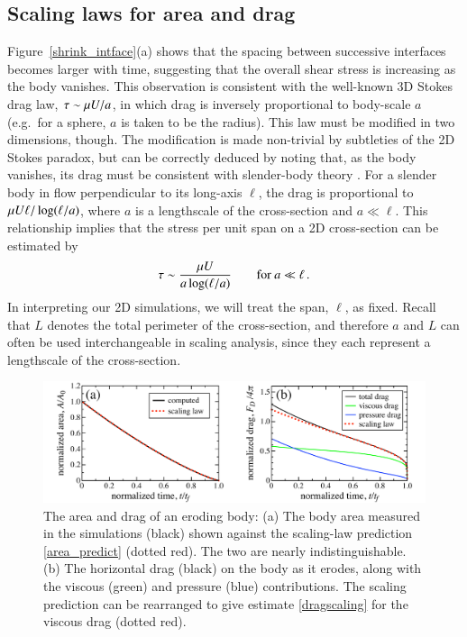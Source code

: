 \documentclass[preprint, 10pt]{elsarticle}
\begin{document}
\subsection{Scaling laws for area and drag}
\label{sec:scaling}

Figure~\ref{shrink_intface}(a) shows that the spacing between successive interfaces becomes larger with time, suggesting that the overall shear stress is increasing as the body vanishes. This observation is consistent with the well-known 3D Stokes drag law, $\tau \sim \mu U / a$, in which drag is inversely proportional to body-scale $a$ (e.g.~for a sphere, $a$ is taken to be the radius). This law must be modified in two dimensions, though. The modification is made non-trivial by subtleties of the 2D Stokes paradox, but can be correctly deduced by noting that, as the body vanishes, its drag must be consistent with slender-body theory \cite{poz1997, bouzarth2007epicyclic, camassa2008trajectory, MooreJFM2012, zhao2015transportation}. 
For a slender body in flow perpendicular to its long-axis $\ell$, the drag is proportional to
$\mu U \ell/ \log(\ell/a)$, where $a$ is a lengthscale of the cross-section and $a \ll \ell$. This relationship implies that the stress per unit span on a 2D cross-section can be estimated by
\begin{align}
  \label{eqn:stresslaw}
  \tau \sim \frac{\mu U}{a \log(\ell/a)} \qquad \text{for } a \ll \ell \, .
\end{align}
In interpreting our 2D simulations, we will treat the span, $\ell$, as fixed. Recall that $L$ denotes the total perimeter of the cross-section, and therefore $a$ and $L$ can often be used interchangeable in scaling analysis, since they each represent a lengthscale of the cross-section.

\begin{figure}%
\begin{center}
\includegraphics[width = 0.9 \textwidth]{./figs/area_drag.pdf}
\caption{The area and drag of an eroding body: (a) The body area measured in the simulations (black) shown against the scaling-law prediction \eqref{area_predict} (dotted red). The two are nearly indistinguishable. (b) The horizontal drag (black) on the body as it erodes, along with the viscous (green) and pressure (blue) contributions. The scaling prediction can be rearranged to give estimate \eqref{dragscaling} for the viscous drag (dotted red).}
\label{area_drag}
\end{center}
\end{figure}
\end{document}
